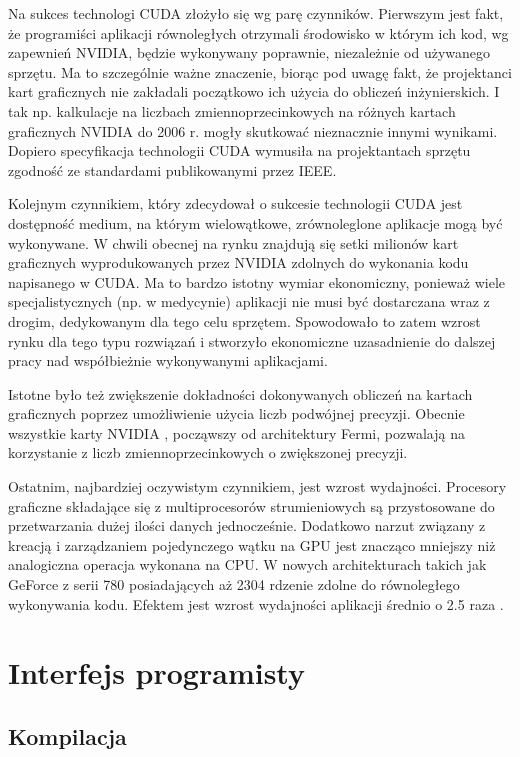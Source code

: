 Na sukces technologi CUDA złożyło się wg \cite{massive} parę czynników.
Pierwszym jest fakt, że programiści aplikacji równoległych otrzymali środowisko
w którym ich kod, wg zapewnień NVIDIA, będzie wykonywany poprawnie, niezależnie
od używanego sprzętu. Ma to szczególnie ważne znaczenie, biorąc pod uwagę fakt,
   że projektanci kart graficznych nie zakładali początkowo ich użycia do
   obliczeń inżynierskich. I tak np. kalkulacje na liczbach zmiennoprzecinkowych
   na różnych kartach graficznych NVIDIA do 2006 r. mogły skutkować nieznacznie innymi
   wynikami. Dopiero specyfikacja technologii CUDA wymusiła na projektantach
   sprzętu zgodność ze standardami publikowanymi przez IEEE.

Kolejnym czynnikiem, który zdecydował o sukcesie technologii CUDA jest
dostępność medium, na którym wielowątkowe, zrównoleglone aplikacje mogą być
wykonywane. W chwili obecnej na rynku znajdują się setki milionów kart
graficznych wyprodukowanych przez NVIDIA zdolnych do wykonania kodu napisanego w
CUDA. Ma to bardzo istotny wymiar ekonomiczny, ponieważ wiele specjalistycznych
(np. w medycynie) aplikacji nie musi być dostarczana wraz z drogim,
	dedykowanym dla tego celu sprzętem. Spowodowało to zatem wzrost rynku dla
	tego typu rozwiązań i stworzyło ekonomiczne uzasadnienie do dalszej pracy
	nad współbieżnie wykonywanymi aplikacjami.

Istotne było też zwiększenie dokładności dokonywanych obliczeń na kartach
graficznych poprzez umożliwienie użycia liczb podwójnej precyzji. Obecnie
wszystkie karty NVIDIA , począwszy od architektury Fermi, pozwalają na
korzystanie z liczb zmiennoprzecinkowych o zwiększonej precyzji.

Ostatnim, najbardziej oczywistym czynnikiem, jest wzrost wydajności. Procesory
graficzne składające się z multiprocesorów strumieniowych są przystosowane do
przetwarzania dużej ilości danych jednocześnie. Dodatkowo narzut związany z
kreacją i zarządzaniem pojedynczego wątku na GPU jest znacząco mniejszy niż
analogiczna operacja wykonana na CPU.  W nowych architekturach takich jak
GeForce z serii 780 posiadających aż 2304 rdzenie zdolne do równoległego
wykonywania kodu. Efektem jest wzrost wydajności aplikacji średnio
o 2.5 raza \cite{cpuvsgpu}.

\section{Interfejs programisty}

\subsection{Kompilacja}


